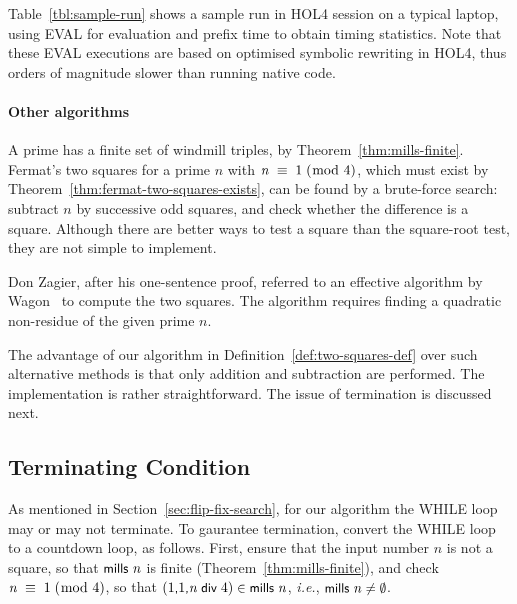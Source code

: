 \documentclass[sigplan,screen]{acmart}
\newcommand{\ie}{\textit{i.e.}}
\renewcommand{\HOLinline}[1]{\ensuremath{#1}} %
\renewcommand{\HOLConst}[1]{{\fontsize{9pt}{1em}\selectfont\textsf{\upshape #1}}}
\renewcommand{\HOLNumLit}[1]{{\selectfont\textrm{\upshape #1}}} %
\renewcommand{\HOLSymConst}[1]{{\fontsize{9pt}{1em}\selectfont\textsf{\upshape #1}}}
\begin{document}
Table~\ref{tbl:sample-run} shows a sample run in HOL4 session on a typical laptop,
using \HOLConst{EVAL} for evaluation and prefix \HOLConst{time} to obtain timing statistics.
Note that these \HOLConst{EVAL} executions are based on optimised symbolic rewriting in HOL4, thus orders of magnitude slower than running native code.

\paragraph*{Other algorithms}
A prime has a finite set of windmill triples, by Theorem~\ref{thm:mills-finite}.
Fermat's two squares for a prime $n$ with \HOLinline{\HOLFreeVar{n}\;\ensuremath{\equiv}\;\HOLNumLit{1}\;\ensuremath{(}\ensuremath{\bmod}\;\HOLNumLit{4}\ensuremath{)}}, which must exist by Theorem~\ref{thm:fermat-two-squares-exists},
can be found by a brute-force search: subtract $n$ by successive odd squares, and check whether the difference is a square. Although there are better ways to test a square than the  square-root test, they are not simple to implement.

Don Zagier, after his one-sentence proof, referred to an effective algorithm by Wagon~\cite{Wagon-1990-acm} to compute the two squares. The algorithm requires finding a quadratic non-residue of the given prime $n$.

The advantage of our algorithm in Definition~\ref{def:two-squares-def} over such alternative methods is that only addition and subtraction are performed.
The implementation is rather straightforward. The issue of termination is discussed next.

\subsection{Terminating Condition}
\label{sec:termination}
As mentioned in Section~\ref{sec:flip-fix-search}, for our algorithm the WHILE loop may or may not terminate. To gaurantee termination, convert the WHILE loop to a countdown loop, as follows. First, ensure that the input number $n$ is not a square, so that \HOLinline{\HOLConst{mills}\;\HOLFreeVar{n}} is finite (Theorem~\ref{thm:mills-finite}), and check \HOLinline{\HOLFreeVar{n}\;\ensuremath{\equiv}\;\HOLNumLit{1}\;\ensuremath{(}\ensuremath{\bmod}\;\HOLNumLit{4}\ensuremath{)}}, so that \HOLinline{(\HOLNumLit{1}\HOLSymConst{,}\HOLNumLit{1}\HOLSymConst{,}\HOLFreeVar{n}\;\HOLConst{\HOLConst{div}}\;\HOLNumLit{4})\;\HOLSymConst{\HOLTokenIn{}}\;\HOLConst{mills}\;\HOLFreeVar{n}}, \ie, \HOLinline{\HOLConst{mills}\;\HOLFreeVar{n}\;\HOLSymConst{\HOLTokenNotEqual{}}\;\HOLSymConst{\HOLTokenEmpty{}}}.
\end{document}
